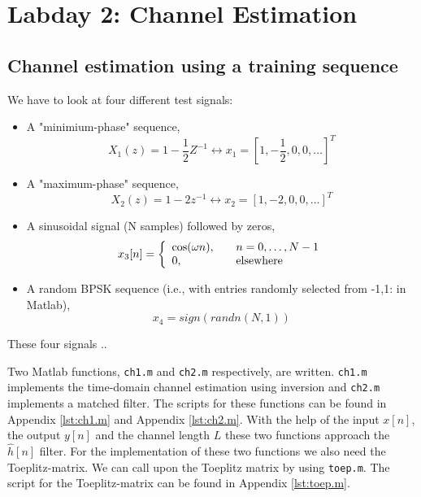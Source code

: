 \documentclass[final]{scrreprt} %
\begin{document}
\chapter{Labday 2: Channel Estimation}
\label{ch:labday2}

\section{Channel estimation using a training sequence}

We have to look at four different test signals:

\begin{itemize}
\item 	A "minimium-phase" sequence, 
\begin{equation}
X_1(z) = 1 - \dfrac{1}{2}Z^{-1} \leftrightarrow x_1 = [1, -\dfrac{1}{2}, 0, 0,  \dots]^T
\end{equation}
\item A "maximum-phase" sequence,
\begin{equation}
X_2(z) = 1 - 2z^{-1} \leftrightarrow x_2 = [1, -2, 0, 0, \dots]^T
\end{equation}
\item A sinusoidal signal (N samples) followed by zeros,
\[ x_3[n] = \left\{ 
  \begin{array}{l l}
    \cos(\omega n), & \quad n = 0, \dots ,N - 1\\
    0, & \quad \textrm{elsewhere}
  \end{array} \right.\]
\item A random BPSK sequence (i.e., with entries randomly selected from {-1,1}: in Matlab),
\begin{equation}
x_4 = sign(randn(N,1))
\end{equation}
\end{itemize}

These four signals ..

Two Matlab functions, \texttt{ch1.m} and \texttt{ch2.m} respectively, are written. 
\texttt{ch1.m} implements the time-domain channel estimation using inversion and \texttt{ch2.m} implements a matched filter.
The scripts for these functions can be found in Appendix \ref{lst:ch1.m} and Appendix \ref{lst:ch2.m}.
With the help of the input $x[n]$, the output $y[n]$ and the channel length $L$ these two functions approach the $\hat{h}[n]$ filter. 
For the implementation of these two functions we also need the Toeplitz-matrix. 
We can call upon the Toeplitz matrix by using \texttt{toep.m}. 
The script for the Toeplitz-matrix can be found in Appendix \ref{lst:toep.m}.
\end{document}
